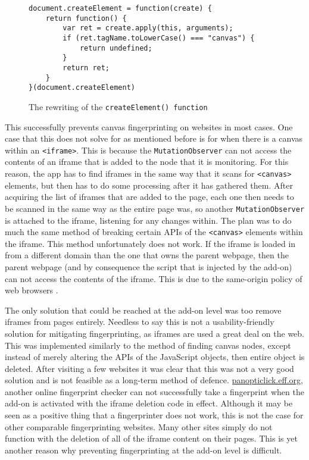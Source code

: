 \begin{figure}[h!]
\begin{lstlisting}
document.createElement = function(create) {
    return function() {
        var ret = create.apply(this, arguments);
        if (ret.tagName.toLowerCase() === "canvas") {
            return undefined;
        }
        return ret;
    }
}(document.createElement)
\end{lstlisting}
\caption{The rewriting of the \texttt{createElement() function}}
\label{lst:create-element}
\end{figure}

This successfully prevents canvas fingerprinting on websites in most cases.
One case that this does not solve for as mentioned before is for when there is a canvas within an \texttt{<iframe>}.
This is because the \texttt{MutationObserver} can not access the contents of an iframe that is added to the node that it is monitoring.
For this reason, the app has to find iframes in the same way that it scans for \texttt{<canvas>} elements, but then has to do some processing after it has gathered them.
After acquiring the list of iframes that are added to the page, each one then needs to be scanned in the same way as the entire page was, so another \texttt{MutationObserver} is attached to the iframe, listening for any changes within.
The plan was to do much the same method of breaking certain APIs of the \texttt{<canvas>} elements within the iframe.
This method unfortunately does not work.
If the iframe is loaded in from a different domain than the one that owns the parent webpage, then the parent webpage (and by consequence the script that is injected by the add-on) can not access the contents of the iframe.
This is due to the same-origin policy of web browsers \citep{same-origin}.

The only solution that could be reached at the add-on level was too remove iframes from pages entirely.
Needless to say this is not a usability-friendly solution for mitigating fingerprinting, as iframes are used a great deal on the web.
This was implemented similarly to the method of finding canvas nodes, except instead of merely altering the APIs of the JavaScript objects, then entire object is deleted.
After visiting a few websites it was clear that this was not a very good solution and is not feasible as a long-term method of defence.
\url{panopticlick.eff.org}, another online fingerprint checker can not successfully take a fingerprint when the add-on is activated with the iframe deletion code in effect.
Although it may be seen as a positive thing that a fingerprinter does not work, this is not the case for other comparable fingerprinting websites.
Many other sites simply do not function with the deletion of all of the iframe content on their pages.
This is yet another reason why preventing fingerprinting at the add-on level is difficult.

